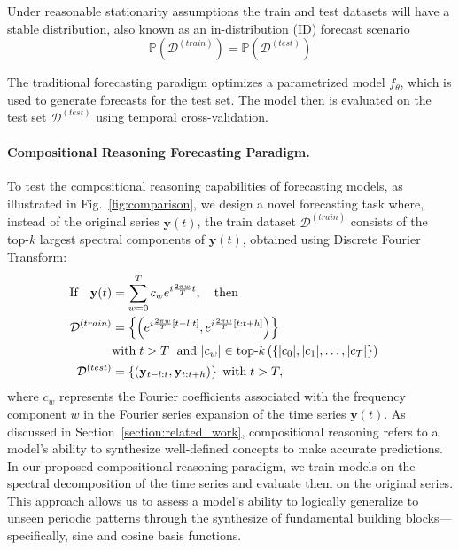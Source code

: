 Under reasonable stationarity assumptions the train and test datasets will have a stable distribution, also known as an in-distribution (ID) forecast scenario 
\begin{equation}
\mathbb{P}(\mathcal{D}^{(train)})= \mathbb{P}(\mathcal{D}^{(test)})
\end{equation}

The traditional forecasting paradigm optimizes a parametrized model $f_\theta$, which is used to generate forecasts for the test set. The model then is evaluated on the test set $\mathcal{D}^{(test)}$ using temporal cross-validation.

\paragraph{Compositional Reasoning Forecasting Paradigm.} 

To test the compositional reasoning capabilities of forecasting models, as illustrated in Fig.~\ref{fig:comparison}, we design a novel forecasting task where, instead of the original series $\mathbf{y}(t)$, the train dataset $\mathcal{D}^{(train)}$ consists of the top-$k$ largest spectral components of $\mathbf{y}(t)$, obtained using Discrete Fourier Transform: 
\begin{align}
    \text{If} \quad \mathbf{y}(t) &= \sum_{w=0}^T c_w e^{i \frac{2\pi w}{T} t}, \quad \text{then} \\
    \mathcal{D}^{(train)} &= 
    \left\{ 
    \left( e^{i \frac{2\pi w}{T} [t-l:t]},  e^{i \frac{2\pi w}{T} [t:t+h]} \right) 
    \right\} \;  \\
    &\text{with} \; t > T  \; \text{ and } |c_w| \in \text{top-}k \left( \{ |c_0|, |c_1|, \dots, |c_T| \} \right) \quad \notag \\
    \mathcal{D}^{(test)} &= \left\{ (\mathbf{y}_{t-l:t}, \mathbf{y}_{t:t+h}) \right\} \; \text{with} \; t > T,
\end{align}
where $c_w$ represents the Fourier coefficients associated with the frequency component $w$ in the Fourier series expansion of the time series $\textbf{y}(t)$. As discussed in Section~\ref{section:related_work}, compositional reasoning refers to a model's ability to synthesize well-defined concepts to make accurate predictions. In our proposed compositional reasoning paradigm, we train models on the spectral decomposition of the time series and evaluate them on the original series. This approach allows us to assess a model's ability to logically generalize to unseen periodic patterns through the synthesize of fundamental building blocks—specifically, sine and cosine basis functions.


